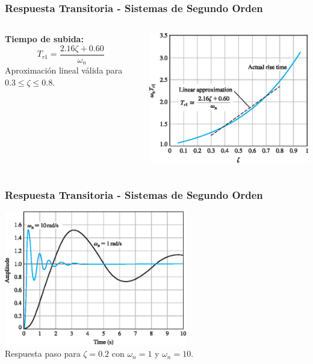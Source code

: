 \documentclass[aspectratio=169,handout]{beamer}
\theoremstyle{definition}
\theoremstyle{plain}
\theoremstyle{remark}
\begin{document}
\begin{frame}[<-+>]\frametitle{Respuesta Transitoria - Sistemas de Segundo Orden}
\vspace*{3mm}
\begin{columns}
 \begin{column}{0.3\textwidth}
 \textbf{Tiempo de subida:}
 \begin{equation*}
   T_{r1} = \frac{2.16\zeta + 0.60}{\omega_n}
 \end{equation*}
 Aproximación lineal válida para $0.3 \leq \zeta \leq 0.8$.
 \end{column} 
 \begin{column}{0.7\textwidth}
  \centering
  \includegraphics[width=9cm]{images/secondOrderRiseTime.eps}
 \end{column} 
\end{columns}
\end{frame}

\begin{frame}[<-+>]\frametitle{Respuesta Transitoria - Sistemas de Segundo Orden}
\vspace*{3mm}
\centering
\includegraphics[width=8cm]{images/secondOrderResponseSameZeta.eps}\\
Respuesta paso para $\zeta = 0.2$ con $\omega_n = 1$ y $\omega_n = 10$.
\end{frame}
\end{document}
